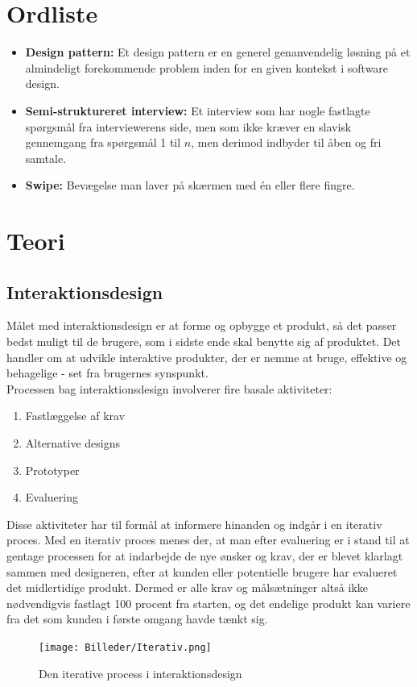 \documentclass[a4paper,10pt,titlepage]{article}
\begin{document}
\section{Ordliste}
\begin{itemize}
\item
\textbf{Design pattern:} Et design pattern er en generel genanvendelig løsning på et almindeligt forekommende problem inden for en given kontekst i software design.
\item
\textbf{Semi-struktureret interview:} Et interview som har nogle fastlagte spørgsmål fra interviewerens side, men som ikke kræver en slavisk gennemgang fra spørgsmål 1 til $n$, men derimod indbyder til åben og fri samtale.
\item
\textbf{Swipe:} Bevægelse man laver på skærmen med én eller flere fingre. 
\end{itemize}
\section{Teori}
\subsection{Interaktionsdesign}
Målet med interaktionsdesign er at forme og opbygge et produkt, så det passer bedst muligt til de brugere, som i sidste ende skal benytte sig af produktet. Det handler om at udvikle interaktive produkter, der er nemme at bruge, effektive og behagelige - set fra brugernes synspunkt.\\
Processen bag interaktionsdesign involverer fire basale aktiviteter:
\begin{enumerate}
\item
Fastlæggelse af krav
\item
Alternative designs
\item
Prototyper
\item
Evaluering
\end{enumerate}
Disse aktiviteter har til formål at informere hinanden og indgår i en iterativ proces. Med en iterativ proces menes der, at man efter evaluering er i stand til at gentage processen for at indarbejde de nye ønsker og krav, der er blevet klarlagt sammen med designeren, efter at kunden eller potentielle brugere har evalueret det midlertidige produkt. Dermed er alle krav og målsætninger altså ikke nødvendigvis fastlagt 100 procent fra starten, og det endelige produkt kan variere fra det som kunden i første omgang havde tænkt sig. \parencite[pp. 2-15]{Interaction}
\begin{figure}[H]
\centering
\texttt{[image: Billeder/Iterativ.png]}
\caption{Den iterative process i interaktionsdesign\parencite{Interaction}}
\end{figure}
\end{document}
